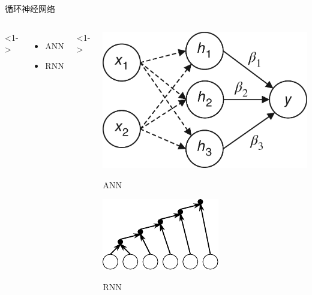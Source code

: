 \begin{xframe}{循环神经网络}

    \begin{columns}
        <1->
        \begin{itemize}
            \item {ANN\\
            }

            \vspace{3em}

            \item {RNN\\
            }
        \end{itemize}
        <1->
        \begin{center}
            \includegraphics[height=0.3\textheight]{./style/images/fc.png}

            ANN

            \includegraphics[height=0.3\textheight]{./style/images/rnn.pdf}

            RNN
        \end{center}

    \end{columns}
\end{xframe}

